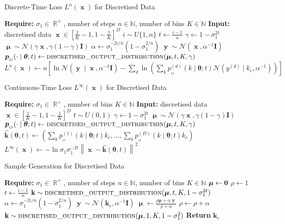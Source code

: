 \documentclass[11pt,table]{article}
\DeclareMathOperator{\x}{\mathbf{x}}
\DeclareMathOperator{\y}{\mathbf{y}}
\renewcommand{\k}{\mathbf{k}}
\DeclareMathOperator{\m}{\boldsymbol{\mu}}
\newcommand{\N}[2]{\mathcal{N}\left(#1 , #2\right)}
\DeclareMathOperator{\R}{\mathbb{R}}
\newcommand{\I}[1]{\boldsymbol{I}}
\newcommand{\didx}[2]{#1^{(#2)}}
\renewcommand{\vec}[1]{\boldsymbol{#1}}
\newcommand{\pars}{\theta}
\newcommand{\parsn}{\vec{\pars}}
\newcommand{\0}[1]{\constvec{0}{#1}}
\newcommand{\1}[1]{\constvec{1}{#1}}
\newcommand{\yd}{y}
\newcommand{\ydd}[1]{\didx{\yd}{#1}}
\newcommand{\out}{p_{_O}}
\newcommand{\outn}{\vec{p}_{_O}}
\newcommand{\pred}[1]{\hat{#1}}
\begin{document}
\begin{algorithm}[H]
\caption{Discrete-Time Loss $L^{n}(\x)$ for Discretised Data}\label{alg:n_step_loss_discd}
\begin{algorithmic}
\State \textbf{Require:} $\sigma_1 \in \R^+$, number of steps $n \in \mathbb{N}$, number of bins $K \in \mathbb{N}$
\State \textbf{Input:} discretised data $\x \in [\frac{1}{K}-1,1-\frac{1}{K}]^D$
\State $i \sim U\{1, n\}$
\State $t \leftarrow \frac{i-1}{n}$
\State $\gamma \leftarrow 1 - \sigma_1^{2 t}$
\State $\m \sim \N{\gamma \x}{\gamma(1-\gamma)\I{D}}$
\State $\alpha \gets \sigma_1^{-2 i / n} \left(1-\sigma_1^{2/n}\right)$
\State $\y \sim \N{\x}{\alpha^{-1}\I{D}}$
\State $\outn(\cdot \mid \parsn; t) \leftarrow \text{\sc{\lstinline{discretised_output_distribution}}}(\m, t, K, \gamma)$
\State $ L^n(\x) \gets n \left[\ln \N{\y \mid \x}{\alpha^{-1}\I{D}} - \sum_{d}\ln \left(\sum_{k} \out^{(d)}(k \mid \parsn; t) \N{\ydd{d} \mid k_c}{\alpha^{-1}}\right)\right]$
\end{algorithmic}
\end{algorithm}
\begin{algorithm}[H]
\caption{Continuous-Time Loss $L^{\infty}(\x)$ for Discretised Data}\label{alg:cts_t_loss_discd}
\begin{algorithmic}
\State \textbf{Require:} $\sigma_1 \in \R^+$, number of bins $K \in \mathbb{N}$
\State \textbf{Input:} discretised data $\x \in [\frac{1}{K}-1,1-\frac{1}{K}]^D$
\State $t \sim U(0,1)$
\State $\gamma \leftarrow 1 - \sigma_1^{2t}$
\State $\m \sim \N{\gamma \x}{\gamma(1-\gamma)\I{D}}$
\State $\outn(\cdot \mid \parsn; t) \leftarrow \text{\sc{\lstinline{discretised_output_distribution}}}(\m, t, K, \gamma)$
\State $\mathbf{\pred{k}}(\parsn, t) \gets \left(\sum_k \out^{(1)}(k \mid \parsn; t)k_c,\dots, \sum_k \out^{(D)}(k \mid \parsn; t) k_c\right)$
\State $ L^{\infty}(\x) \gets -\ln \sigma_1 \sigma_1^{-2t}\left\|\x -\mathbf{\pred{k}}(\parsn, t) \right\|^2$
\end{algorithmic}
\end{algorithm}
\begin{algorithm}[H]
\caption{Sample Generation for Discretised Data}\label{alg:samp_gen_discd}
\begin{algorithmic}
\LineComment{$\vec{k}_{c} = \left(k^{(1)}_c,\dots,k^{(D)}_c\right)$}
\State \textbf{Require:} $\sigma_1 \in \R^+$, number of steps $n \in \mathbb{N}$, number of bins $K \in \mathbb{N}$
\State $\boldsymbol{\mu} \gets \0{D}$
\State $\rho \gets 1$
    \State $t \leftarrow \frac{i-1}{n}$
    \State $\k \sim \text{\sc{\lstinline{discretised_output_distribution}}}(\m, t, K, 1 - \sigma_1^{2 t})$
    \State $\alpha \gets \sigma_1^{-2 i / n} \left(1-\sigma_1^{2/n}\right)$
    \State $\y \sim \N{\k_c}{\alpha^{-1}\I{D}}$
    \State $\m \gets \frac{\rho\boldsymbol{\mu} + \alpha\y}{\rho + \alpha}$
    \State $\rho \gets \rho + \alpha$
\EndFor
\State $\k \sim \text{\sc{\lstinline{discretised_output_distribution}}}(\m, 1, K, 1 - \sigma_1^{2})$
\State \textbf{Return} $\k_c$
\end{algorithmic}
\end{algorithm}
\end{document}
